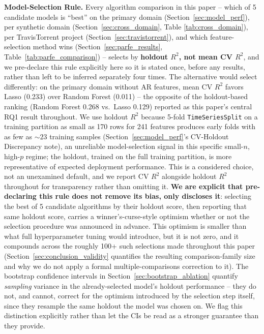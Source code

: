 \documentclass[technologies,article,submit,pdftex,moreauthors]{Definitions/mdpi}
\begin{document}
\textbf{Model-Selection Rule.} Every algorithm comparison in this
paper -- which of 5 candidate models is ``best'' on the primary domain
(Section~\ref{sec:model_perf}), per synthetic domain (Section~\ref{sec:cross_domain}, Table
\ref{tab:cross_domain}), per TravisTorrent project (Section~\ref{sec:travistorrent}), and
which feature-selection method wins (Section~\ref{sec:parfe_results}, Table~\ref{tab:parfe_comparison}) -- selects by
\textbf{holdout \(R^2\), not mean CV \(R^2\)}, and we pre-declare this
rule explicitly here so it is stated once, before any results, rather
than left to be inferred separately four times. The alternative would
select differently: on the primary domain without AR features, mean CV
\(R^2\) favors Lasso (0.233) over Random Forest (0.011) -- the opposite
of the holdout-based ranking (Random Forest 0.268 vs.~Lasso 0.129)
reported as this paper's central RQ1 result throughout. We use holdout
\(R^2\) because 5-fold \texttt{TimeSeriesSplit} on a training partition
as small as 170 rows for 241 features produces early folds with as few
as \(\sim 23\) training samples (Section~\ref{sec:model_perf}'s CV-Holdout Discrepancy
note), an unreliable model-selection signal in this specific
small-\(n\), high-\(p\) regime; the holdout, trained on the full
training partition, is more representative of expected deployment
performance. This is a considered choice, not an unexamined default, and
we report CV \(R^2\) alongside holdout \(R^2\) throughout for
transparency rather than omitting it. \textbf{We are explicit that
pre-declaring this rule does not remove its bias, only discloses it}:
selecting the best of 5 candidate algorithms by their holdout score,
then reporting that same holdout score, carries a winner's-curse-style
optimism whether or not the selection procedure was announced in
advance. This optimism is smaller than what full hyperparameter tuning
would introduce, but it is not zero, and it compounds across the
roughly 100+ such selections made throughout this paper
(Section~\ref{sec:conclusion_validity} quantifies the resulting
comparison-family size and why we do not apply a formal
multiple-comparisons correction to it). The bootstrap confidence
intervals in Section~\ref{sec:bootstrap_ablation} quantify \emph{sampling}
variance in the already-selected model's holdout performance -- they do
not, and cannot, correct for the optimism introduced by the selection
step itself, since they resample the same holdout the model was chosen
on. We flag this distinction explicitly rather than let the CIs be read
as a stronger guarantee than they provide.
\end{document}
